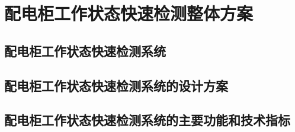 \begin{conclusion}
\label{配电柜工作状态快速检测整体方案}
\chapter{配电柜工作状态快速检测整体方案}
\section{配电柜工作状态快速检测系统}
\section{配电柜工作状态快速检测系统的设计方案}
\section{配电柜工作状态快速检测系统的主要功能和技术指标}
\end{conclusion}



